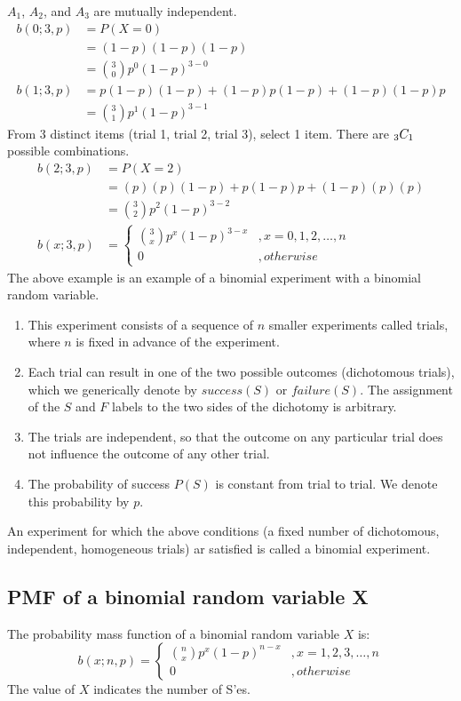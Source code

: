 \documentclass{math}
\begin{document}
\( A_{1} \), \( A_{2} \), and \( A_{3} \) are mutually independent.
\begin{align*}
  b(0;3,p) &= P(X=0) \\
  &= (1-p)(1-p)(1-p) \\
  &= \binom{3}{0}p^{0}(1-p)^{3-0} \\
  b(1;3,p) &= p(1-p)(1-p)+(1-p)p(1-p)+(1-p)(1-p)p \\
  &= \binom{3}{1}p^{1}(1-p)^{3-1}
\end{align*}
From 3 distinct items (trial 1, trial 2, trial 3), select 1 item. There are
\( _{3}C_{1} \) possible combinations.
\begin{align*}
  b(2;3,p) &= P(X=2) \\
  &= (p)(p)(1-p)+p(1-p)p+(1-p)(p)(p) \\
  &= \binom{3}{2}p^{2}(1-p)^{3-2} \\
  b(x;3,p) &=
  \begin{cases}
    \binom{3}{x}p^{x}(1-p)^{3-x} &, x = 0,1,2,\dots,n \\
    0 &, otherwise
  \end{cases}
\end{align*}
The above example is an example of a binomial experiment with a binomial random
variable.
\begin{enumerate}
  \item This experiment consists of a sequence of \( n \) smaller experiments
    called trials, where \( n \) is fixed in advance of the experiment.
  \item Each trial can result in one of the two possible outcomes (dichotomous
    trials), which we generically denote by \( success(S) \) or
    \( failure(S) \). The assignment of the \( S \) and \( F \) labels to the
    two sides of the dichotomy is arbitrary.
  \item The trials are independent, so that the outcome on any particular trial
    does not influence the outcome of any other trial.
  \item The probability of success \( P(S) \) is constant from trial to trial.
    We denote this probability by \( p \).
\end{enumerate}
An experiment for which the above conditions (a fixed number of dichotomous,
independent, homogeneous trials) ar satisfied is called a binomial experiment.

\subsection*{PMF of a binomial random variable X}
The probability mass function of a binomial random variable \( X \) is:
\[ b(x;n,p) =
  \begin{cases}
    \binom{n}{x}p^{x}(1-p)^{n-x} &, x = 1,2,3,\dots,n \\
    0 &, otherwise
  \end{cases}
\]
The value of \( X \) indicates the number of S'es. \par
\end{document}
